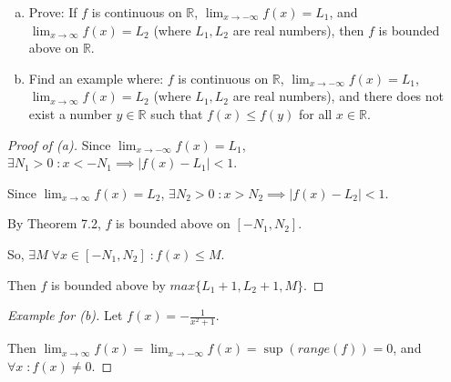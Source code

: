 \documentclass{article} %
\theoremstyle{plain}
\theoremstyle{definition}
\newcommand{\Rb}{\mathbb{R}}
\begin{document}
    \noindent{} 
    \begin{enumerate}[(a)]
    \item Prove: If $f$ is continuous on $\Rb$, $\lim_{x \rightarrow -\infty} f(x) = L_1$, and $\lim_{x \rightarrow \infty} f(x) = L_2$ (where $L_1, L_2$ are real numbers), then $f$ is bounded above on $\Rb$. 
\item Find an example where: $f$ is continuous on $\Rb$, $\lim_{x \rightarrow -\infty} f(x) = L_1$, $\lim_{x \rightarrow \infty} f(x) = L_2$ (where $L_1, L_2$ are real numbers), and there does not exist a number $y \in \Rb$ such that $f(x) \leq f(y)$ for all $x \in \Rb$. 
\end{enumerate} 

\begin{proof}[Proof of (a)] 
    Since $\lim_{x \to - \infty} f(x) = L_1$, $\exists N_1 > 0 \; \colon x < -N_1 \implies |f(x) - L_1| < 1$.

    Since $\lim_{x \to \infty} f(x) = L_2$, $\exists N_2 > 0 \; \colon x > N_2 \implies |f(x) - L_2| < 1$.

    By Theorem 7.2, $f$ is bounded above on $[-N_1, N_2]$.

    So, $\exists M \; \forall x \in [-N_1, N_2] \; \colon f(x) \leq M$.

    Then $f$ is bounded above by $max \{ L_1 + 1, L_2 + 1, M \}$.
\end{proof}

\begin{proof}[Example for (b)]
    Let $f(x) = - \frac{1}{x^2 + 1}$.

    Then $\lim_{x \to \infty} f(x) = \lim_{x \to - \infty} f(x) = \sup(range(f)) = 0$, and $\forall x \; \colon f(x) \neq 0$.
\end{proof}


    





    
    
\end{document}
